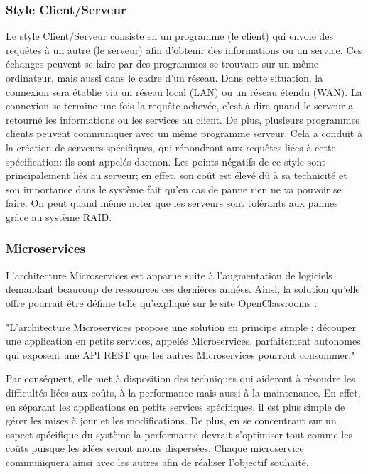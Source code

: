 \documentclass[12pt]{article}
\begin{document}
\subsubsection{Style Client/Serveur}

Le style Client/Serveur\cite{client_serveur} consiste en un programme (le client) qui envoie des requêtes à un autre (le serveur) afin d'obtenir des informations ou un service. Ces échanges peuvent se faire par des programmes se trouvant sur un même ordinateur, mais aussi dans le cadre d'un réseau. Dans cette situation, la connexion sera établie via un réseau local (LAN) ou un réseau étendu (WAN). La connexion se termine une fois la requête achevée, c'est-à-dire quand le serveur a retourné les informations ou les services au client. De plus, plusieurs programmes clients peuvent communiquer avec un même programme serveur. Cela a conduit à la création de serveurs spécifiques, qui répondront aux requêtes liées à cette spécification: ils sont appelés daemon. Les points négatifs de ce style sont principalement liés au serveur; en effet, son coût est élevé dû à sa technicité et son importance dans le système fait qu'en cas de panne rien ne va pouvoir se faire. On peut quand même noter que les serveurs sont tolérants aux pannes grâce au système RAID.

\subsubsection{Microservices}

L'architecture Microservices est apparue suite à l'augmentation de logiciels demandant beaucoup de ressources ces dernières années. Ainsi, la solution qu'elle offre pourrait être définie telle qu'expliqué sur le site OpenClassrooms\cite{microservices} : 
\begin{center}
"L'architecture Microservices propose une solution en principe simple : découper une application en petits services, appelés Microservices, parfaitement autonomes qui exposent une API REST que les autres Microservices pourront consommer."
\end{center}
Par conséquent, elle met à disposition des techniques qui aideront à résoudre les difficultés liées aux coûts, à la performance mais aussi à la maintenance. En effet, en séparant les applications en petits services spécifiques, il est plus simple de gérer les mises à jour et les modifications. De plus, en se concentrant sur un aspect spécifique du système la performance devrait s'optimiser tout comme les coûts puisque les idées seront moins dispersées. Chaque microservice communiquera ainsi avec les autres afin de réaliser l'objectif souhaité.
\end{document}
